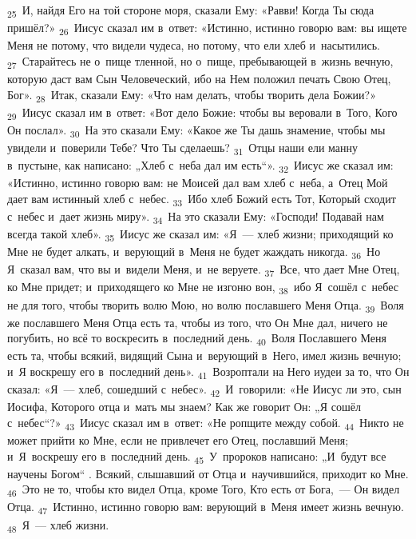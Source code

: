 \documentclass[a4paper,12pt]{article}
\begin{document}
\textsubscript{25}~И, найдя Его на той стороне моря, сказали Ему: «Равви! Когда Ты сюда пришёл?»
\textsubscript{26}~Иисус сказал им в~ответ: «Истинно, истинно говорю вам: вы ищете Меня не потому, что видели чудеса, но потому, что ели хлеб и~насытились.
\textsubscript{27}~Старайтесь не о~пище тленной, но о~пище, пребывающей в~жизнь вечную, которую даст вам Сын Человеческий, ибо на Нем положил печать Свою Отец, Бог».
\textsubscript{28}~Итак, сказали Ему: «Что нам делать, чтобы творить дела Божии?»
\textsubscript{29}~Иисус сказал им в~ответ: «Вот дело Божие: чтобы вы веровали в~Того, Кого Он послал».
\textsubscript{30}~На это сказали Ему: «Какое же Ты дашь знамение, чтобы мы увидели и~поверили Тебе? Что Ты сделаешь?
\textsubscript{31}~Отцы наши ели манну в~пустыне, как написано: „Хлеб с~неба дал им есть“».
\textsubscript{32}~Иисус же сказал им: «Истинно, истинно говорю вам: не Моисей дал вам хлеб с~неба, а~Отец Мой дает вам истинный хлеб с~небес.
\textsubscript{33}~Ибо хлеб Божий есть Тот, Который сходит с~небес и~дает жизнь миру».
\textsubscript{34}~На это сказали Ему: «Господи! Подавай нам всегда такой хлеб».
\textsubscript{35}~Иисус же сказал им: «Я~--- хлеб жизни; приходящий ко Мне не будет алкать, и~верующий в~Меня не будет жаждать никогда.
\textsubscript{36}~Но Я~сказал вам, что вы и~видели Меня, и~не веруете.
\textsubscript{37}~Все, что дает Мне Отец, ко Мне придет; и~приходящего ко Мне не изгоню вон,
\textsubscript{38}~ибо Я~сошёл с~небес не для того, чтобы творить волю Мою, но волю пославшего Меня Отца.
\textsubscript{39}~Воля же пославшего Меня Отца есть та, чтобы из того, что Он Мне дал, ничего не погубить, но всё то воскресить в~последний день.
\textsubscript{40}~Воля Пославшего Меня есть та, чтобы всякий, видящий Сына и~верующий в~Него, имел жизнь вечную; и~Я воскрешу его в~последний день».
\textsubscript{41}~Возроптали на Него иудеи за то, что Он сказал: «Я~--- хлеб, сошедший с~небес».
\textsubscript{42}~И~говорили: «Не Иисус ли это, сын Иосифа, Которого отца и~мать мы знаем? Как же говорит Он: „Я сошёл с~небес“?»
\textsubscript{43}~Иисус сказал им в~ответ: «Не ропщите между собой.
\textsubscript{44}~Никто не может прийти ко Мне, если не привлечет его Отец, пославший Меня; и~Я~воскрешу его в~последний день.
\textsubscript{45}~У~пророков написано: „И~будут все научены Богом“ . Всякий, слышавший от Отца и~научившийся, приходит ко Мне.
\textsubscript{46}~Это не то, чтобы кто видел Отца, кроме Того, Кто есть от Бога,~--- Он видел Отца.
\textsubscript{47}~Истинно, истинно говорю вам: верующий в~Меня имеет жизнь вечную.
\textsubscript{48}~Я~--- хлеб жизни.
\end{document}
